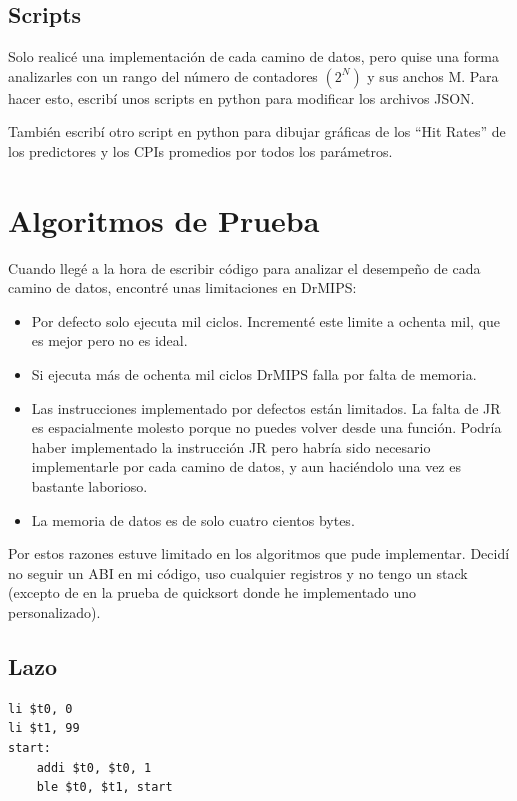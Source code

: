 \documentclass[a4paper]{article}
\begin{document}
\subsection{Scripts}

Solo realicé una implementación de cada camino de datos, pero quise una forma analizarles con un rango del número de contadores $(2^N)$ y sus anchos M. Para hacer esto, escribí unos scripts en python para modificar los archivos JSON.

También escribí otro script en python para dibujar gráficas de los ``Hit Rates'' de los predictores y los CPIs promedios por todos los parámetros.

\section{Algoritmos de Prueba}

Cuando llegé a la hora de escribir código para analizar el desempeño de cada camino de datos, encontré unas limitaciones en DrMIPS:

\begin{itemize}
    \item Por defecto solo ejecuta mil ciclos. Incrementé este limite a ochenta mil, que es mejor pero no es ideal.
    \item Si ejecuta más de ochenta mil ciclos DrMIPS falla por falta de memoria.
    \item Las instrucciones implementado por defectos están limitados. La falta de JR es espacialmente molesto porque no puedes volver desde una función. Podría haber implementado la instrucción JR pero habría sido necesario implementarle por cada camino de datos, y aun haciéndolo una vez es bastante laborioso.
    \item La memoria de datos es de solo cuatro cientos bytes.
\end{itemize}

Por estos razones estuve limitado en los algoritmos que pude implementar. Decidí no seguir un ABI en mi código, uso cualquier registros y no tengo un stack (excepto de en la prueba de quicksort donde he implementado uno personalizado).

\subsection{Lazo}

\begin{verbatim}
li $t0, 0
li $t1, 99
start:
	addi $t0, $t0, 1
	ble $t0, $t1, start
\end{verbatim}
\end{document}
